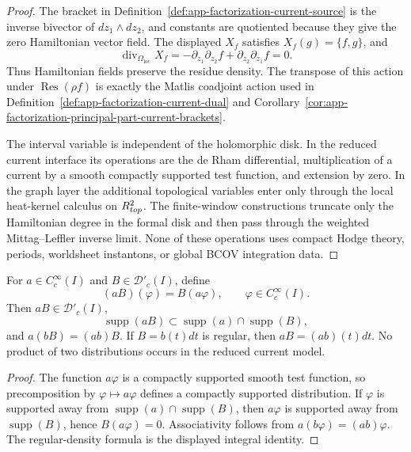 \begin{proof}
  The bracket in
  Definition~\ref{def:app-factorization-current-source} is the inverse
  bivector of \(dz_1\wedge dz_2\), and constants are quotiented because
  they give the zero Hamiltonian vector field.  The displayed
  \(X_f\) satisfies \(X_f(g)=\{f,g\}\), and
  \[
    \operatorname{div}_{\Omega_{\mathrm{loc}}}X_f
      =-\partial_{z_1}\partial_{z_2}f
        +\partial_{z_2}\partial_{z_1}f=0.
  \]
  Thus Hamiltonian fields preserve the residue density.  The transpose
  of this action under
  \(\operatorname{Res}(\rho f)\) is exactly the Matlis coadjoint action
  used in
  Definition~\ref{def:app-factorization-current-dual} and
  Corollary~\ref{cor:app-factorization-principal-part-current-brackets}.

  The interval variable is independent of the holomorphic disk.  In the
  reduced current interface its operations are the de Rham differential,
  multiplication of a current by a smooth compactly supported test
  function, and extension by zero.  In the graph layer the additional
  topological variables enter only through the local heat-kernel
  calculus on \(R^2_{top}\).  The finite-window constructions
  truncate only the Hamiltonian degree in the formal disk and then pass
  through the weighted Mittag--Leffler inverse limit.  None of these
  operations uses compact Hodge theory, periods, worldsheet instantons,
  or global BCOV integration data.
\end{proof}

\begin{lem}
\label{lem:app-factorization-current-product}
  For \(a\in C^\infty_c(I)\) and \(B\in\mathcal D'_c(I)\), define
  \[
    (aB)(\varphi)=B(a\varphi),
    \qquad \varphi\in C^\infty_c(I).
  \]
  Then \(aB\in\mathcal D'_c(I)\),
  \[
    \operatorname{supp}(aB)\subset
    \operatorname{supp}(a)\cap\operatorname{supp}(B),
  \]
  and \(a(bB)=(ab)B\).  If \(B=b(t)dt\) is regular, then
  \(aB=(ab)(t)dt\).  No product of two distributions occurs in the
  reduced current model.
\end{lem}

\begin{proof}
  The function \(a\varphi\) is a compactly supported smooth test
  function, so precomposition by \(\varphi\mapsto a\varphi\) defines a
  compactly supported distribution.  If \(\varphi\) is supported away
  from \(\operatorname{supp}(a)\cap\operatorname{supp}(B)\), then
  \(a\varphi\) is supported away from \(\operatorname{supp}(B)\), hence
  \(B(a\varphi)=0\).  Associativity follows from
  \(a(b\varphi)=(ab)\varphi\).  The regular-density formula is the
  displayed integral identity.
\end{proof}

